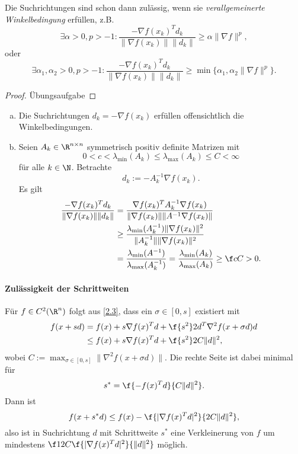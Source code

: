 

\begin{nt} \label{2.31}
	Die Suchrichtungen sind schon dann zulässig, wenn sie \emph{verallgemeinerte Winkelbedingung} erfüllen, z.B.
	\[
		\exists \alpha > 0, p > -1
		: \dfrac {-\nabla f(x_k)^T d_k}{\|\nabla f(x_k)\| \|d_k\|}
		\ge \alpha \|\nabla f\|^p,
	\]
	oder
	\[
		\exists \alpha_1, \alpha_2 > 0, p > -1
		: \dfrac {-\nabla f(x_k)^Td_k}{\|\nabla f(x_k)\|\|d_k\|} \ge \min\{ \alpha_1, \alpha_2 \|\nabla f\|^p \}.
	\]
	\begin{proof}
		Übungsaufgabe
	\end{proof}
\end{nt}

\begin{ex} \label{2.32}
	\begin{enumerate}[(a)]
		\item
			Die Suchrichtungen $d_k = -\nabla f(x_k)$ erfüllen offensichtlich die Winkelbedingungen.
		\item
			Seien $A_k \in \R^{n\times n}$ symmetrisch positiv definite Matrizen mit
			\[
				0
				< c
				< \lambda_{\text{min}}(A_k)
				\le \lambda_{\text{max}}(A_k)
				\le C
				< \infty
			\]
			für alle $k \in \N$.
			Betrachte
			\[
				d_k := - A_k^{-1} \nabla f(x_k).
			\]
			Es gilt
			\begin{align*}
				\dfrac {-\nabla f(x_k)^T d_k}{\|\nabla f(x_k)\|\|d_k\|}
				&= \dfrac {\nabla f(x_k)^T A_k^{-1} \nabla f(x_k)}{\|\nabla f(x_k)\|\|A^{-1} \nabla f(x_k)\|} \\
				&\ge \dfrac {\lambda_{\text{min}} (A_k^{-1}) \|\nabla f(x_k)\|^2}{\|A_k^{-1}\| \|\nabla f(x_k)\|^2} \\
				&= \dfrac {\lambda_{\text{min}}(A^{-1})}{\lambda_{\text{max}}(A_k^{-1})}
				= \dfrac {\lambda_{\text{min}}(A_k)}{\lambda_{\text{max}}(A_k)}
				\ge \f cC
				> 0.
			\end{align*}
	\end{enumerate}
\end{ex}

\paragraph{Zulässigkeit der Schrittweiten}
Für $f \in C^2(\R^n)$ folgt aus \ref{2.3}, dass ein $\sigma \in [0,s]$ existiert mit
\begin{align*}
	f(x+sd)
	&= f(x) + s\nabla f(x)^T d + \f {s^2}2 d^T \nabla^2 f(x + \sigma d)d \\
	&\le f(x) + s\nabla f(x)^T d + \f {s^2}2 C \|d\|^2,
\end{align*}
wobei $C := \max_{\sigma\in[0,s]} \|\nabla^2 f(x + \sigma d) \|$.
Die rechte Seite ist dabei minimal für
\[
	s^* = \f{-f(x)^T d}{C\|d\|^2}.
\]
Dann ist
\[
	f(x+s^*d)
	\le f(x) - \f{|\nabla f(x)^T d|^2}{2C\|d\|^2},
\]
also ist in Suchrichtung $d$ mit Schrittweite $s^*$ eine Verkleinerung von $f$ um mindestens $\f 1{2C} \f {|\nabla f(x)^T d|^2}{\|d\|^2}$ möglich.

